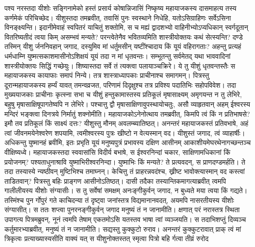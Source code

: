 \vakya पश्य नरस्तदा यीशोः सङ्गिनामेको हस्तं प्रसार्य कोषान्निजासिं निष्कृष्य महायाजकस्य दासमाहत्य तस्य कर्णमेकं परिचिच्छेद।
\vakya यीशुस्तदा तमब्रवीत्, तवासिं पुनः स्वस्थाने निधेहि, यतोऽसिग्राहिणः सर्वेऽसिना विनङ्क्ष्यन्ति।
\vakya इदानीमेवाहं स्वपितरं याचितुं शक्तोमि, स च मह्यं द्वादशभ्यो वाहिनीभ्योऽप्यधिकान् स्वर्गदूतान् वितरिष्यतीदं त्वया किम् असम्भवं मन्यते?
\vakya परन्त्वेतेनैव भवितव्यमिति शास्त्रीयोक्तयः कथं सेत्स्यन्ति?
\vakya दण्डे तस्मिन् यीशु र्जननिवहान् जगाद, दस्युमिव मां धर्तुमसीन् यष्टींश्चादाय किं यूयं वहिरागताः? अहन्तु प्रत्यहं धर्मधाम्नि युष्मत्सकाशमासीनोऽशिक्षयं यूयं तदा न मां धृतवन्तः।
\vakya सम्भूतन्तु सर्वमेतद् यथा भाववादिनां शास्त्रीयोक्तयः सिद्धिं गच्छेयुः। शिष्यास्तदा सर्वे तं त्यक्त्वा पलायाञ्चक्रिरे।
\vakya ये तु यीशुं धृतवन्तस्तैः स महायाजकस्य कायाफाः समापं निन्ये। तत्र शास्त्राध्यापकाः प्राचीनाश्च समागमन्।
\vakya पित्रस्तु दूरान्महायाजकस्य हर्म्यं यावत् तमन्वव्रजत, परिणामं दिदृक्षुश्च तत्र प्रविश्य पदातिभिः सहोपविवेश।
\vakya तदा मुख्ययाजकाः प्राचीनाः कृत्स्ना सभा च यीशुं हन्तुकामास्तस्य प्रतिकूलं मृषासाक्ष्यम् अमृगयन्त न तु लेभिरे,
\vakya बहुषु मृषासाक्षिषूपागतेष्वपि न लेभिरे। पश्चात्तु द्वौ मृषासाक्षिणावुपस्थायोचतुः,
\vakya असौ व्याहृतवान् अहम् ईश्वरस्य मन्दिरं भङ्क्त्वा दिनत्रये निर्मातुं शक्नोमीति।
\vakya महायाजकोऽनेनोत्थाय तमब्रवीत्, किमपि त्वं किं न प्रतिभाषसे? इमौ तव प्रतिकूलं किं साक्ष्यं दत्तः?
\vakya यीशुस्तु मौनम् अवलम्ब्यातिष्ठत्। अनन्तरं महायाजकस्तं प्रतिवभाषे, अहं त्वां जीवनमयेनेश्वरेण शपयामि, त्वमीश्वरस्य पुत्रः खीष्टो न वेत्यस्मान् वद।
\vakya यीशुस्तं जगाद, त्वं व्याहार्षीः। अधिकन्तु युष्मानहं ब्रवीमि, इतः प्रभृति यूयं मनुष्यपुत्रं प्रभावस्य दक्षिण आसीनम् आकाशीयमेघरथेनागच्छन्तञ्च वीक्षिष्यध्वे।
\vakya महायाजकस्तदा स्ववासांसि विदीर्य बभाषे, स ईश्वरनिन्दां चकार, साक्षिणामधिकानां किं प्रयोजनम्? पश्यताधुनाश्रावि युष्माभिरीश्वरनिन्दा।
\vakya युष्माभिः किं मन्यते? ते प्रत्यवदन्, स प्राणदण्डमर्हति।
\vakya ते तदा तस्यास्ये न्यष्ठीवन् मुष्टिभिश्च तमाघ्नन्।
\vakya केचित्तु तं प्राहरन्नवदंश्च, ख्रीष्ट भावोक्त्यास्मान् वद कस्त्वां ताडितवान्?
\vakya पित्रस्तु बहिः प्राङ्गण आसीनोऽतिष्ठत्। दासी तदैका तस्यान्तिकमागत्याब्रवीत् त्वमपि गालीलीयस्य यीशोः संग्यासीः।
\vakya स तु सर्वेषां समक्षम् अनःङ्गीकुर्वन् जगाद, न बुध्यते मया त्वया किं गद्यते।
\vakya तस्मिंश्च पुन र्गोपुरं गते काचिदन्या तं दृष्ट्वा जनांस्तत्र विद्यमानानवदत्, अयमपि नासरतीयस्य यीशोः संग्यासीत्।
\vakya स ततः शप्त्वा पुनरनङ्गीकुर्वन् जगाद मनुष्यं तं न जानामीति।
\vakya क्षणात् परं नरास्तत्र स्थिता उपागत्य पित्रमब्रुवन्, नूनं त्वमपि तेषाम् एकतमोऽसि यतस्तव भाषा त्वां व्यञ्जयति।
\vakya स तदाभिशप्तुं दिव्यञ्च कर्तुमारभ्याब्रवीत्, मनुष्यं तं न जानामीति। सद्यस्तु कुक्कुटो रुराव।
\vakya अनन्तरं कुक्कुटरावात् प्राक् त्वं मां त्रिकृत्वः प्रत्याख्यास्यसीति वाक्यं यत् स यीशुनोक्तस्तत् स्मृत्वा पित्रो बहि र्गत्वा तीव्रं रुरोद\eoc